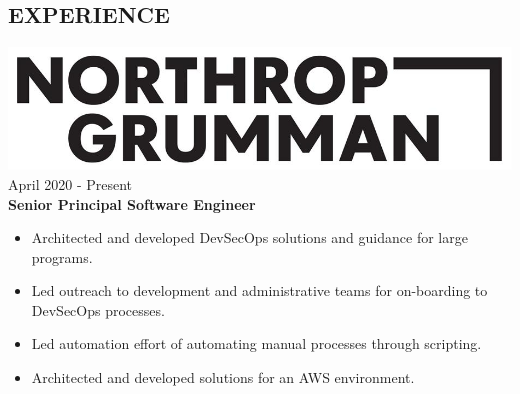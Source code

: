\documentclass[12pt, line, margin]{res}
\begin{document}
\begin{resume}
\section{ EXPERIENCE} {\sl  \includegraphics[scale=0.115, trim=10 10 25 25]{resume_images/Northrop_Grumman-2020-black-logo.jpeg}} \hfill April 2020 - Present \\
                \textbf{Senior Principal Software Engineer} 
                 \begin{itemize}  \itemsep -2pt %
	         \item   Architected and developed DevSecOps solutions and guidance for
	                       large programs.
	         \item   Led outreach to development and administrative teams for \newline
                                on-boarding to DevSecOps processes.
                  \item   Led automation effort of automating manual processes through 
                                scripting.
                  \item   Architected and developed solutions for an AWS environment.
                \end{itemize}



\end{resume}
\end{document}
